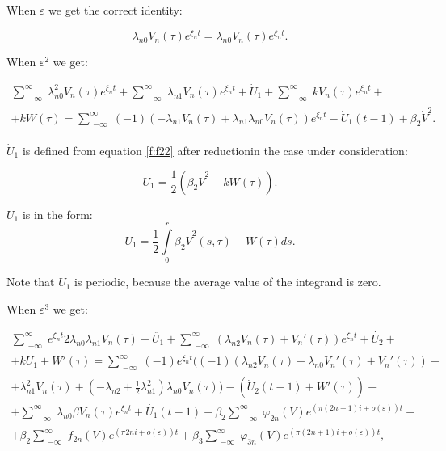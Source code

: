 \documentclass[12pt]{article} %
\newcommand{\eps}{\varepsilon}
\begin{document}
When \(\varepsilon \) we get the correct identity:

\[
\lambda_{n0}V_n(\tau)e^{\xi_nt}=\lambda_{n0}V_n(\tau)e^{\xi_nt}.
\]

When \(\varepsilon^2\) we get:

\begin{equation}
\begin{array}{cc}
\sum\limits_{\substack{ -\infty }}^\infty\lambda_{n0}^2V_n(\tau)e^{\xi_nt}+\sum\limits_{\substack{ -\infty }}^\infty\lambda_{n1}V_n(\tau)e^{\xi_nt}+\dot U_1+\sum\limits_{\substack{ -\infty }}^\infty kV_n(\tau)e^{\xi_nt}+\\ +kW(\tau)=\sum\limits_{\substack{ -\infty }}^\infty (-1)(-\lambda_{n1}V_n(\tau)+\lambda_{n1}\lambda_{n0}V_n(\tau))e^{\xi_nt}
-\dot{U}_1(t-1)+\beta_2\dot{V}^2.
\end{array}
\label{f:f22}
\end{equation}


\noindent  \(\dot{U}_1\)  is defined from equation  \eqref{f:f22} after reductionin the case under consideration:

\[
\dot{U}_1=\frac{1}{2}(\beta_2\dot{V}^2-kW(\tau)).
\]

\noindent \(U_1\) is in the form:
\[
U_1=\frac{1}{2}\int\limits_0^r\beta_2\dot{V}^2(s,\tau)-W(\tau)ds.
\]

Note that $U_1$ is periodic, because the average value of the integrand is zero.

When \(\varepsilon^3\) we get:

\begin{equation}
\begin{array}{cc}
\sum\limits_{\substack{ -\infty }}^\infty e^{\xi_nt}2\lambda_{n0}\lambda_{n1}V_n(\tau)+\ddot{U_1}+\sum\limits_{\substack{ -\infty }}^\infty(\lambda_{n2}V_n(\tau)+V_n'(\tau))e^{\xi_nt}+\dot{U_2}+\\
+kU_1+W'(\tau)=\sum\limits_{\substack{ -\infty }}^\infty(-1)e^{\xi_nt}((-1)(\lambda_{n2}V_n(\tau)-\lambda_{n0}V_n'(\tau)+V_n'(\tau))+\\
+\lambda_{n1}^2V_n(\tau)+(-\lambda_{n2}+\displaystyle\frac{1}{2}\lambda_{n1}^2)\lambda_{n0}V_n(\tau))-(\dot{U}_2(t-1)+W'(\tau))+\\
+\sum\limits_{\substack{ -\infty }}^\infty\lambda_{n0}\beta V_n(\tau)e^{\xi_nt}+\dot{U_1}(t-1)+\beta_2\sum\limits_{\substack{ -\infty }}^\infty\varphi_{2n}(V)e^{(\pi(2n+1)i+o(\eps))t}+\\
+\beta_2\sum\limits_{\substack{ -\infty }}^\infty f_{2n}(V)e^{(\pi2ni+o(\eps))t}+\beta_3\sum\limits_{\substack{ -\infty }}^\infty\varphi_{3n}(V)e^{(\pi(2n+1)i+o(\eps))t},
\end{array}
\label{f:f23}
\end{equation}
\end{document}
